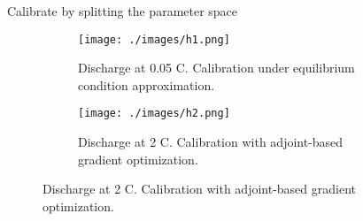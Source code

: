 \documentclass{beamer}
\begin{document}




\begin{frame}{Calibrate by splitting the parameter space}


  \begin{figure}
    \centering
    \captionsetup[subfigure]{justification=centering}
    \begin{subfigure}[]{0.45\linewidth}
      \centering
      \texttt{[image: ./images/h1.png]}
      \caption{Discharge at 0.05 C. Calibration under equilibrium condition approximation.}
    \end{subfigure}
    \begin{subfigure}[]{0.45\linewidth}
      \centering
      \texttt{[image: ./images/h2.png]}
      \caption{Discharge at 2 C. Calibration with adjoint-based gradient optimization. }
    \end{subfigure}
  \end{figure}

\end{frame}
\end{document}
